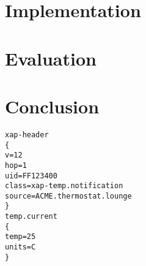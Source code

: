 \documentclass{l4proj}
\begin{document}




\chapter{Implementation} %
\label{cha:implementation}





\chapter{Evaluation} %
\label{cha:evaluation}






\chapter{Conclusion} %
\label{cha:conclusion}




\begin{appendices}
\begin{verbatim}
xap-header
{
v=12
hop=1
uid=FF123400
class=xap-temp.notification
source=ACME.thermostat.lounge
}
temp.current
{
temp=25
units=C
}
\end{verbatim}

\end{appendices}




\end{document}
